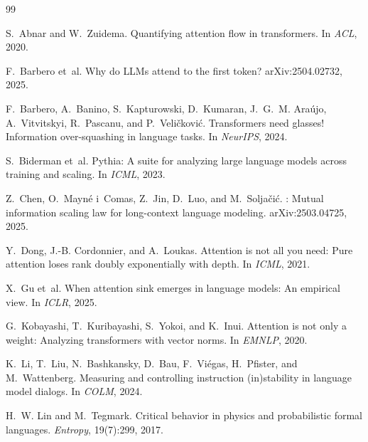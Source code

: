 \documentclass[11pt]{article}
\theoremstyle{definition}
\theoremstyle{remark}
\begin{document}
\begin{thebibliography}{99}

S.~Abnar and W.~Zuidema.
\newblock Quantifying attention flow in transformers.
\newblock In \emph{ACL}, 2020.

F.~Barbero et~al.
\newblock Why do {LLMs} attend to the first token?
\newblock arXiv:2504.02732, 2025.

F.~Barbero, A.~Banino, S.~Kapturowski, D.~Kumaran, J.~G.~M. Ara{\'u}jo, A.~Vitvitskyi, R.~Pascanu, and P.~Veli{\v{c}}kovi{\'c}.
\newblock Transformers need glasses! {I}nformation over-squashing in language tasks.
\newblock In \emph{NeurIPS}, 2024.

S.~Biderman et~al.
\newblock Pythia: A suite for analyzing large language models across training and scaling.
\newblock In \emph{ICML}, 2023.

Z.~Chen, O.~Mayn{\'e} i~Comas, Z.~Jin, D.~Luo, and M.~Solja{\v{c}}i{\'c}.
: Mutual information scaling law for long-context language modeling.
\newblock arXiv:2503.04725, 2025.

Y.~Dong, J.-B. Cordonnier, and A.~Loukas.
\newblock Attention is not all you need: Pure attention loses rank doubly exponentially with depth.
\newblock In \emph{ICML}, 2021.

X.~Gu et~al.
\newblock When attention sink emerges in language models: An empirical view.
\newblock In \emph{ICLR}, 2025.

G.~Kobayashi, T.~Kuribayashi, S.~Yokoi, and K.~Inui.
\newblock Attention is not only a weight: Analyzing transformers with vector norms.
\newblock In \emph{EMNLP}, 2020.

K.~Li, T.~Liu, N.~Bashkansky, D.~Bau, F.~Vi{\'e}gas, H.~Pfister, and M.~Wattenberg.
\newblock Measuring and controlling instruction (in)stability in language model dialogs.
\newblock In \emph{COLM}, 2024.

H.~W. Lin and M.~Tegmark.
\newblock Critical behavior in physics and probabilistic formal languages.
\newblock \emph{Entropy}, 19(7):299, 2017.


\end{thebibliography}
\end{document}
